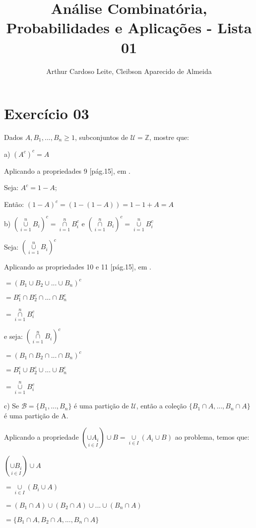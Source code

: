 \documentclass[12pt]{article}
\title{Análise Combinatória, Probabilidades e Aplicações - Lista 01}
\author{{Arthur Cardoso Leite}, {Cleibson Aparecido de Almeida}}
\begin{document}
\maketitle

\section*{Exercício 03}

Dados $A, B_1, ... , B_n \geq 1$, subconjuntos de $\mathcal{U} = \mathbb{Z}$, mostre que:

a) $(A^c)^c = A$

Aplicando a propriedades 9 [pág.15], em \cite{morgado_1991}. 

Seja: $A^c = 1-A$;

Então: $(1-A)^c = (1-(1-A)) = 1-1+A = A$

\bigskip

b) $(\overset{n}{\underset{i=1}{\cup}} B_i)^c = \overset{n}{\underset{i=1}{\cap}} B_i^c$ e $(\overset{n}{\underset{i=1}{\cap}} B_i)^c = \overset{n}{\underset{i=1}{\cup}} B_i^c$

Seja: $(\overset{n}{\underset{i=1}{\cup}} B_i)^c$

Aplicando as propriedades 10 e 11 [pág.15], em \cite{morgado_1991}. 

$= (B_1 \cup B_2 \cup ... \cup B_n)^c$

$= B_1^c \cap B_2^c \cap ... \cap B_n^c$

$= \overset{n}{\underset{i=1}{\cap}} B_i^c$

e seja: $(\overset{n}{\underset{i=1}{\cap}} B_i)^c$

$= (B_1 \cap B_2 \cap ... \cap B_n)^c$

$= B_1^c \cup B_2^c \cup ... \cup B_n^c$

$= \overset{n}{\underset{i=1}{\cup}} B_i^c$

\bigskip

c) Se $\mathcal{B}=\{B_1,...,B_n\}$ é uma partição de $\mathcal{U}$, então a coleção $\{B_1 \cap A, ..., B_n \cap A\}$ é uma partição de A.

Aplicando a propriedade $(\underset{i \in I}{\cup A_i}) \cup B = \underset{i \in I}{\cup} (A_i \cup B)$ ao problema, temos que:

$(\underset{i \in I}{\cup B_i}) \cup A$

$= \underset{i \in I}{\cup} (B_i \cup A)$

$=(B_1 \cap A) \cup (B_2 \cap A) \cup ... \cup (B_n \cap A)$

$=\{B_1 \cap A, B_2 \cap A, ... , B_n \cap A\}$
\end{document}
